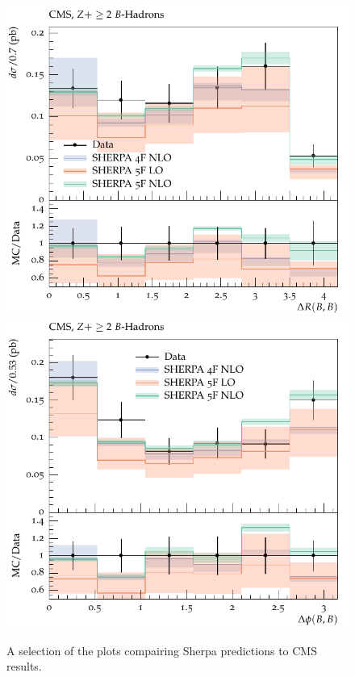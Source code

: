 \documentclass[11pt]{cernrep} \usepackage{graphicx,epsfig} 
\begin{document}
\begin{figure}[htbp]
   \includegraphics[scale=0.65]{figs/zbb/sherpa/d01-x01-y01.pdf} 
   \includegraphics[scale=0.65]{figs/zbb/sherpa/d02-x01-y01.pdf} 
\caption{A selection of the plots compairing Sherpa predictions to CMS results.}
\label{zbb-sherpa-cms}
\end{figure}
\end{document}
